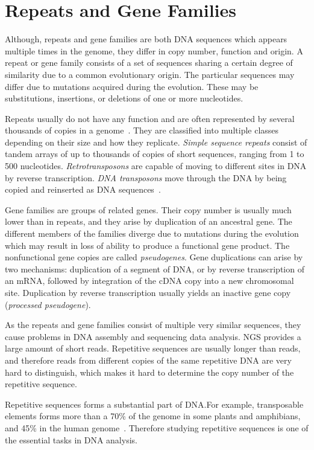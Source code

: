 \chapter{Repeats and Gene Families}\label{chap:repeatsfamilies}

Although, repeats and gene families are both DNA sequences which appears multiple times in the genome, they differ in copy number, function and origin.
A repeat or gene family consists of a set of sequences sharing a certain degree of similarity due to a common evolutionary origin. The particular sequences may differ due to mutations acquired during the evolution. These may be substitutions, insertions, or deletions of one or more nucleotides.

Repeats usually do not have any function and are often represented by several thousands of copies in a genome~\cite{cell}. They are classified into multiple classes depending on their size and how they replicate.
\emph{Simple sequence repeats} consist of tandem arrays of up to thousands of copies of short sequences, ranging from 1 to 500 nucleotides.
\emph{Retrotransposons} are capable of moving to different sites in DNA by reverse transcription.
\emph{DNA transposons} move through the DNA by being copied and reinserted as DNA sequences~\cite{cell}.

Gene families are groups of related genes.
Their copy number is usually much lower than in repeats, and they arise by duplication of an ancestral gene. The different members of the families diverge due to mutations during the evolution which may result in loss of ability to produce a functional gene product. The nonfunctional gene copies are called \emph{pseudogenes}.
Gene duplications can arise by two mechanisms: duplication of a segment of DNA, or by reverse transcription of an mRNA, followed by integration of the cDNA copy into a new chromosomal site.
Duplication by reverse transcription usually yields an inactive gene copy (\emph{processed pseudogene}).

As the repeats and gene families consist of multiple very similar sequences, they cause problems in DNA assembly and sequencing data analysis. NGS provides a large amount of short reads. Repetitive sequences are usually longer than reads, and therefore reads from different copies of the same repetitive DNA are very hard to distinguish, which makes it hard to determine the copy number of the repetitive sequence.

Repetitive sequences forms a substantial part of DNA.\@ For example,
transposable elements forms more than a 70\% of the genome in some plants and amphibians, and 45\% in the human genome~\cite{biemont2006genetics}.
Therefore studying repetitive sequences is one of the essential tasks in DNA analysis.

